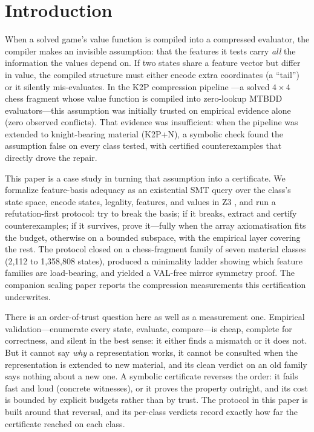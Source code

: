 \documentclass[conference]{IEEEtran}
\begin{document}
\section{Introduction}
When a solved game's value function is compiled into a compressed evaluator,
the compiler makes an invisible assumption: that the features it tests carry
\emph{all} the information the values depend on. If two states share a
feature vector but differ in value, the compiled structure must either
encode extra coordinates (a ``tail'') or it silently mis-evaluates. In the
K2P compression pipeline \cite{k2p2025}---a solved $4\times4$ chess fragment
whose value function is compiled into zero-lookup MTBDD evaluators---this
assumption was initially trusted on empirical evidence alone (zero observed
conflicts). That evidence was insufficient: when the pipeline was extended
to knight-bearing material (K2P+N), a symbolic check found the assumption
false on every class tested, with certified counterexamples that directly
drove the repair.

This paper is a case study in turning that assumption into a certificate.
We formalize feature-basis adequacy as an existential SMT query over the
class's state space, encode states, legality, features, and values in Z3
\cite{demoura2008,demoura2011}, and run a refutation-first protocol: try to
break the basis; if it breaks, extract and certify counterexamples; if it
survives, prove it---fully when the array axiomatisation fits the budget,
otherwise on a bounded subspace, with the empirical layer covering the rest.
The protocol closed on a chess-fragment family of seven material classes
(2{,}112 to 1{,}358{,}808 states), produced a minimality ladder showing
which feature families are load-bearing, and yielded a VAL-free mirror
symmetry proof. The companion scaling paper \cite{ccs2026} reports the
compression measurements this certification underwrites.

There is an order-of-trust question here as well as a measurement one.
Empirical validation---enumerate every state, evaluate, compare---is cheap,
complete for correctness, and silent in the best sense: it either finds a
mismatch or it does not. But it cannot say \emph{why} a representation
works, it cannot be consulted when the representation is extended to new
material, and its clean verdict on an old family says nothing about a new
one. A symbolic certificate reverses the order: it fails fast and loud
(concrete witnesses), or it proves the property outright, and its cost is
bounded by explicit budgets rather than by trust. The protocol in this
paper is built around that reversal, and its per-class verdicts record
exactly how far the certificate reached on each class.
\end{document}
